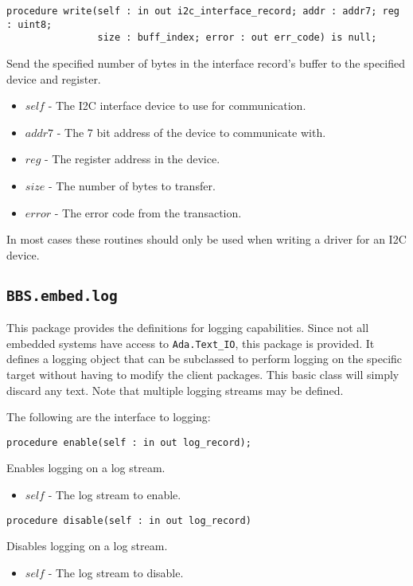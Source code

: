\documentclass[10pt, openany]{book}
\newcommand{\indexfunc}[1]{\index[func]{#1}}
\newcommand{\package}[1]{\texttt{#1}}
\begin{document}
\begin{lstlisting}
procedure write(self : in out i2c_interface_record; addr : addr7; reg : uint8;
                size : buff_index; error : out err_code) is null;
\end{lstlisting}
\indexfunc{write}
Send the specified number of bytes in the interface record's buffer to the specified device and register.
\begin{itemize}
  \item $self$ - The I2C interface device to use for communication.
  \item $addr7$ - The 7 bit address of the device to communicate with.
  \item $reg$ - The register address in the device.
  \item $size$ - The number of bytes to transfer.
  \item $error$ - The error code from the transaction.
\end{itemize}
In most cases these routines should only be used when writing a driver for an I2C device.

\subsection{\package{BBS.embed.log}}
This package provides the definitions for logging capabilities.  Since not all embedded systems have access to \package{Ada.Text\_IO}, this package is provided.  It defines a logging object that can be subclassed to perform logging on the specific target without having to modify the client packages.  This basic class will simply discard any text.  Note that multiple logging streams may be defined.

The following are the interface to logging:
\begin{lstlisting}
procedure enable(self : in out log_record);
\end{lstlisting}
\indexfunc{enable}
Enables logging on a log stream.
\begin{itemize}
  \item $self$ - The log stream to enable.
\end{itemize}

\begin{lstlisting}
procedure disable(self : in out log_record)
\end{lstlisting}
\indexfunc{disable}
Disables logging on a log stream.
\begin{itemize}
  \item $self$ - The log stream to disable.
\end{itemize}
\end{document}
